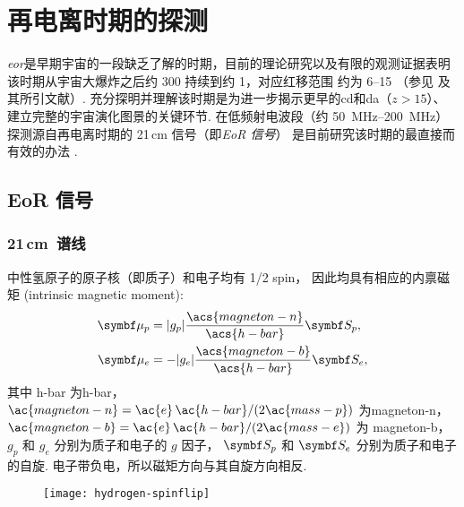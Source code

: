 

\chapter{再电离时期的探测}
\label{chap:detection}


\emph{\acf{eor}}是早期宇宙的一段缺乏了解的时期，目前的理论研究以及有限的观测证据表明
该时期从宇宙大爆炸之后约 \SI{300}{\Myr} 持续到约 \SI{1}{\Gyr}，对应红移范围
约为 \numrange{6}{15} （参见  及其所引文献）.
充分探明并理解该时期是为进一步揭示更早的\ac{cd}和\ac{da}（$z > 15$）、
建立完整的宇宙演化图景的关键环节.
在低频射电波段（约 \SIrange{50}{200}{\MHz}）
探测源自再电离时期的 21\,cm 信号（即\emph{EoR 信号}）
是目前研究该时期的最直接而有效的办法 \cite{madau1997,tozzi2000,furlanetto2006}.


\section{EoR 信号}
\label{sec:eor-signal}

\subsection{21\texorpdfstring{\,}{ }cm~谱线}
\label{sec:21cm-line}

中性氢原子的原子核（即质子）和电子均有 1/2 \ac{spin}，
因此均具有相应的内禀磁矩 (intrinsic magnetic moment):
\begin{align}
  \B{\mu}_p & = |g_p| \frac{\acs{magneton-n}}{\acs{h-bar}} \B{S}_p , \\
  \B{\mu}_e & = - |g_e| \frac{\acs{magneton-b}}{\acs{h-bar}} \B{S}_e ,
\end{align}
其中
\ac{h-bar} 为\acl{h-bar}，
$\ac{magneton-n} = \ac{e}\,\ac{h-bar} / (2 \ac{mass-p})$ 为\acl{magneton-n}，
$\ac{magneton-b} = \ac{e}\,\ac{h-bar} / (2 \ac{mass-e})$ 为 \acl{magneton-b}，
$g_p$ 和 $g_e$ 分别为质子和电子的 $g$ 因子，
$\B{S}_p$ 和 $\B{S}_e$ 分别为质子和电子的自旋.
电子带负电，所以磁矩方向与其自旋方向相反.

\begin{figure}[tbp]
  \centering
  \texttt{[image: hydrogen-spinflip]}
  \label{fig:hi-spinflip}
\end{figure}

